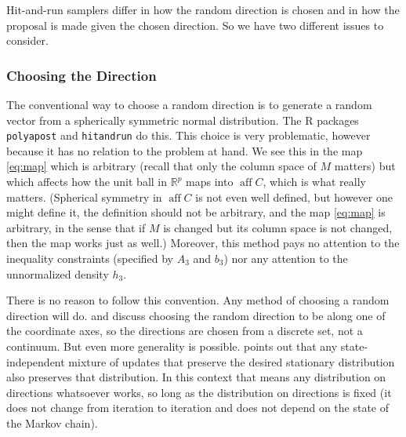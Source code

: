 \documentclass[11pt]{article}
\DeclareMathOperator{\aff}{aff}
\newcommand{\real}{\mathbb{R}}
\begin{document}
Hit-and-run samplers differ in how the random direction is chosen and in
how the proposal is made given the chosen direction.  So we have two
different issues to consider.

\subsubsection{Choosing the Direction}

The conventional way to choose a random direction is to generate
a random vector from a spherically symmetric normal distribution.
The R packages \texttt{polyapost} and \texttt{hitandrun} do this.
This choice is very problematic, however because it has no relation
to the problem at hand.  We see this in the map \eqref{eq:map} which
is arbitrary (recall that only the column space of $M$ matters) but
which affects how the unit ball in $\real^p$ maps into $\aff C$,
which is what really matters.  (Spherical symmetry in $\aff C$ is not
even well defined, but however one might define it, the definition
should not be arbitrary, and the map \eqref{eq:map} is arbitrary,
in the sense that if $M$ is changed but its column space is not changed,
then the map works just as well.)
Moreover, this method pays no attention
to the inequality constraints (specified by $A_3$ and $b_3$) nor any
attention to the unnormalized density $h_3$.

There is no reason to follow this convention.  Any method of choosing
a random direction will do.  \citet{smith} and \citet{hit-run-one}
discuss choosing the random direction to be along one of the coordinate axes,
so the directions are chosen from a discrete set, not a continuum.
But even more generality is possible.
\citet[Section~1.12.8]{geyer-intro} points out
that any state-independent mixture of updates that preserve the desired
stationary distribution also preserves that distribution.  In this context
that means any distribution on directions whatsoever works, so long as the
distribution on directions is fixed (it does not change from iteration
to iteration and does not depend on the state of the Markov chain).
\end{document}

